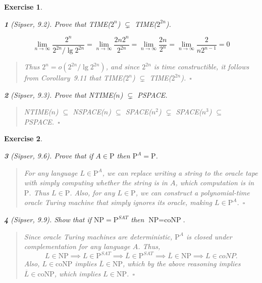 \documentclass{article}
\theoremstyle{break}			%
\newtheorem{exercise}{Exercise}
\theoremstyle{plain}
\newtheorem{subexercise}{}[exercise]
\newenvironment{answer}{\begin{quotation}\noindent}{\end{quotation}}
\newcommand{\sipser}{\textit{Sipser}}
\newcommand{\qed}{~\ensuremath{\square}}
\newcommand{\setname}[1]{\textit{#1}}
\renewcommand{\P}{\textrm{P}}
\newcommand{\NP}{\textrm{NP}}
\newcommand{\coNP}{\textrm{coNP}}
\begin{document}
\begin{exercise}
\begin{subexercise}[\sipser, 9.2]
Prove that TIME($2^n$) $\subsetneq$ TIME($2^{2n}$).
\end{subexercise}
\begin{displaymath}
\lim_{n\to\infty}\frac{2^n}{2^{2n}/\lg 2^{2n}}
=\lim_{n\to\infty}\frac{2n2^n}{2^{2n}} 
=\lim_{n\to\infty}\frac{2n}{2^n} 
=\lim_{n\to\infty}\frac{2}{n2^{n-1}} 
=0
\end{displaymath}
\begin{answer}
Thus $2^n=o(2^{2n}/\lg 2^{2n})$, and since $2^{2n}$ is time
constructible, it follows from Corollary~9.11 that TIME($2^n$)
$\subsetneq$ TIME($2^{2n}$).\qed
\end{answer}

\begin{subexercise}[\sipser, 9.3]
Prove that NTIME($n$) $\subsetneq$ PSPACE.
\end{subexercise}
\begin{answer}
NTIME($n$) $\subseteq$ NSPACE($n$) $\subseteq$ SPACE($n^2$)
$\subsetneq$ SPACE($n^3$) $\subseteq$ PSPACE.\qed
\end{answer}
\end{exercise}

\begin{exercise}
\begin{subexercise}[\sipser, 9.6]
Prove that if $A\in\P$ then $\P^A=\P$.
\end{subexercise}
\begin{answer}
For any language $L\in\P^A$, we can replace writing a string to the
oracle tape with simply computing whether the string is in $A$, which
computation is in $\P$.  Thus $L\in\P$.  Also, for any $L\in\P$, we
can construct a polynomial-time oracle Turing machine that simply
ignores its oracle, making $L\in\P^A$.\qed
\end{answer}

\begin{subexercise}[\sipser, 9.9]
Show that if $\NP = \P^{\setname{SAT}}$ then $\NP = \coNP$.
\end{subexercise}
\begin{answer}
Since oracle Turing machines are deterministic, $\P^A$ is closed under
complementation for any language $A$.  Thus,
\begin{displaymath}
L\in\NP
\implies L\in\P^{\setname{SAT}}
\implies\overline L\in\P^{\setname{SAT}}
\implies\overline L\in\NP
\implies L\in coNP.
\end{displaymath}
Also, $L\in\coNP$ implies $\overline L\in\NP$, which by the above
reasoning implies $\overline L\in\coNP$, which implies
$L\in\NP$.\qed
\end{answer}
\end{exercise}
\end{document}
